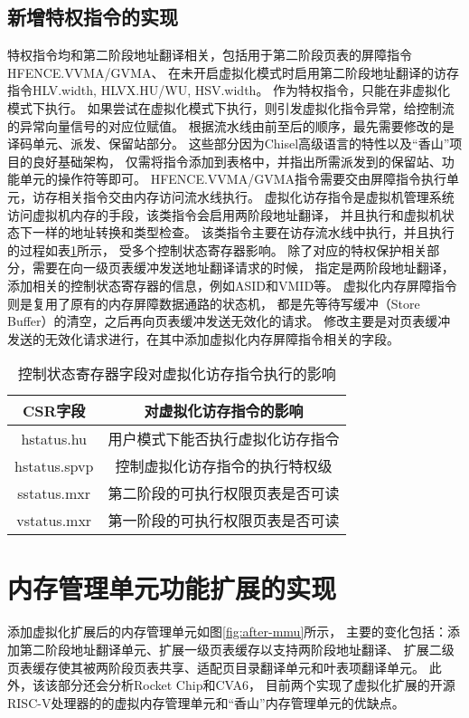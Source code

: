 \subsection{新增特权指令的实现}
特权指令均和第二阶段地址翻译相关，包括用于第二阶段页表的屏障指令HFENCE.VVMA/GVMA、
在未开启虚拟化模式时启用第二阶段地址翻译的访存指令HLV.width, HLVX.HU/WU, HSV.width。
作为特权指令，只能在非虚拟化模式下执行。
如果尝试在虚拟化模式下执行，则引发虚拟化指令异常，给控制流的异常向量信号的对应位赋值。
根据流水线由前至后的顺序，最先需要修改的是译码单元、派发、保留站部分。
这些部分因为Chisel高级语言的特性以及“香山”项目的良好基础架构，
仅需将指令添加到表格中，并指出所需派发到的保留站、功能单元的操作符等即可。
HFENCE.VVMA/GVMA指令需要交由屏障指令执行单元，访存相关指令交由内存访问流水线执行。
虚拟化访存指令是虚拟机管理系统访问虚拟机内存的手段，该类指令会启用两阶段地址翻译，
并且执行和虚拟机状态下一样的地址转换和类型检查。
该类指令主要在访存流水线中执行，并且执行的过程如表\ref{tab:h-ls}所示，
受多个控制状态寄存器影响。
除了对应的特权保护相关部分，需要在向一级页表缓冲发送地址翻译请求的时候，
指定是两阶段地址翻译，添加相关的控制状态寄存器的信息，例如ASID和VMID等。
虚拟化内存屏障指令则是复用了原有的内存屏障数据通路的状态机，
都是先等待写缓冲（Store Buffer）的清空，之后再向页表缓冲发送无效化的请求。
修改主要是对页表缓冲发送的无效化请求进行，在其中添加虚拟化内存屏障指令相关的字段。

\begin{table}
    \centering
    \caption{控制状态寄存器字段对虚拟化访存指令执行的影响}
    \begin{tabular}{cc}
        \toprule
        CSR字段        & 对虚拟化访存指令的影响      \\
        \midrule
        hstatus.hu   & 用户模式下能否执行虚拟化访存指令 \\
        hstatus.spvp & 控制虚拟化访存指令的执行特权级  \\
        sstatus.mxr  & 第二阶段的可执行权限页表是否可读 \\
        vstatus.mxr  & 第一阶段的可执行权限页表是否可读 \\
        \bottomrule
    \end{tabular}
    \label{tab:h-ls}
\end{table}

\section{内存管理单元功能扩展的实现}
添加虚拟化扩展后的内存管理单元如图\ref{fig:after-mmu}所示，
主要的变化包括：添加第二阶段地址翻译单元、扩展一级页表缓存以支持两阶段地址翻译、
扩展二级页表缓存使其被两阶段页表共享、适配页目录翻译单元和叶表项翻译单元。
此外，该该部分还会分析Rocket Chip和CVA6，
目前两个实现了虚拟化扩展的开源RISC-V处理器的的虚拟内存管理单元和“香山”内存管理单元的优缺点。

